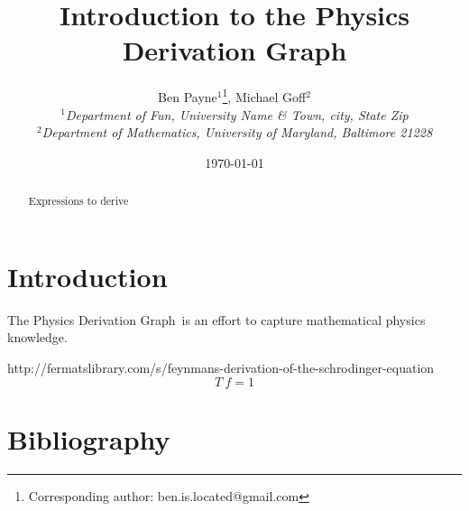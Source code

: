 \documentclass{article}
\newcommand{\pdg}{Physics Derivation Graph}
\begin{document}
\title{Introduction to the \pdg}

\author{Ben Payne$^{1}$\footnote{Corresponding author: ben.is.located@gmail.com}, Michael Goff$^{2}$\\
{\it $^{1}$Department of Fun, University Name \& Town, city, State Zip}\\
{\it $^{2}$Department of Mathematics, University of Maryland, Baltimore 21228}}

\date{\today}

\maketitle %
\begin{abstract}
Expressions to derive
\end{abstract}



\tableofcontents



\section{Introduction\label{sec:intro}}

The \pdg\ is an effort to capture mathematical physics knowledge. 


http://fermatslibrary.com/s/feynmans-derivation-of-the-schrodinger-equation
\begin{equation}
T\ f = 1
\label{eq:period_and_freq}
\end{equation}

\section{Bibliography}



\newpage
\appendix
%
\end{document}
